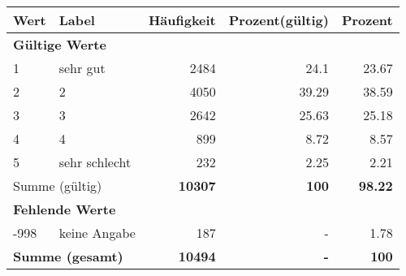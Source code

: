      \begin{longtable}{lXrrr}
     \toprule
     \textbf{Wert} & \textbf{Label} & \textbf{Häufigkeit} & \textbf{Prozent(gültig)} & \textbf{Prozent} \\
     \endhead
     \midrule
     \multicolumn{5}{l}{\textbf{Gültige Werte}}\\

     1 &
     \multicolumn{1}{X}{ sehr gut   } &


       \num{2484} &
       \num[round-mode=places,round-precision=2]{24.1} &
         \num[round-mode=places,round-precision=2]{23.67} \\

     2 &
     \multicolumn{1}{X}{ 2   } &


       \num{4050} &
       \num[round-mode=places,round-precision=2]{39.29} &
         \num[round-mode=places,round-precision=2]{38.59} \\

     3 &
     \multicolumn{1}{X}{ 3   } &


       \num{2642} &
       \num[round-mode=places,round-precision=2]{25.63} &
         \num[round-mode=places,round-precision=2]{25.18} \\

     4 &
     \multicolumn{1}{X}{ 4   } &


       \num{899} &
       \num[round-mode=places,round-precision=2]{8.72} &
         \num[round-mode=places,round-precision=2]{8.57} \\

     5 &
     \multicolumn{1}{X}{ sehr schlecht   } &


       \num{232} &
       \num[round-mode=places,round-precision=2]{2.25} &
         \num[round-mode=places,round-precision=2]{2.21} \\
     \midrule
     \multicolumn{2}{l}{Summe (gültig)} &
       \textbf{\num{10307}} &
     \textbf{\num{100}} &
       \textbf{\num[round-mode=places,round-precision=2]{98.22}} \\
     \multicolumn{5}{l}{\textbf{Fehlende Werte}}\\
       -998 &
       keine Angabe &
         \num{187} &
        - &
         \num[round-mode=places,round-precision=2]{1.78} \\
     \midrule
     \multicolumn{2}{l}{\textbf{Summe (gesamt)}} &
          \textbf{\num{10494}} &
        \textbf{-} &
        \textbf{\num{100}} \\
     \bottomrule
     \end{longtable}
     
